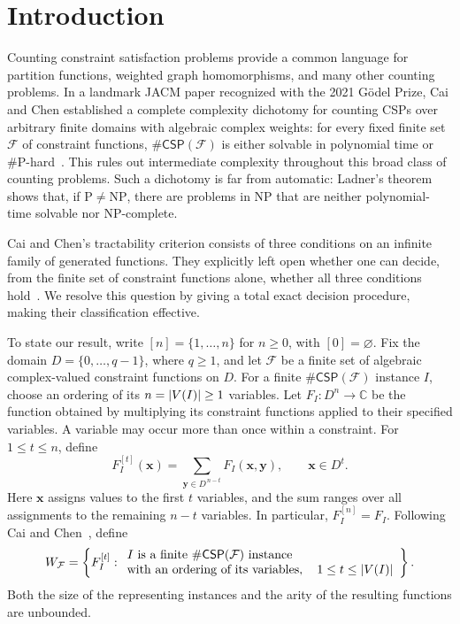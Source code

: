 \documentclass[11pt,letterpaper,onecolumn]{article}
\theoremstyle{plain}
\theoremstyle{definition}
\theoremstyle{remark}
\newcommand{\cF}{\mathcal F}
\newcommand{\CSP}[1]{\mathsf{\#CSP}(#1)}
\DeclarePairedDelimiter{\abs}{\lvert}{\rvert}
\begin{document}
\section{Introduction}
\label{sec:introduction}

Counting constraint satisfaction problems provide a common language for
partition functions, weighted graph homomorphisms, and many other counting
problems.  In a landmark JACM paper recognized with the 2021 G{\"o}del Prize,
Cai and Chen established a complete complexity dichotomy for counting CSPs
over arbitrary finite domains with algebraic complex weights: for every
fixed finite set $\cF$ of constraint functions, $\CSP{\cF}$ is either solvable
in polynomial time or $\#\mathrm P$-hard~\cite{CaiChen2017}.  This rules out
intermediate complexity throughout this broad class of counting problems.
Such a dichotomy is far from automatic: Ladner's theorem~\cite{Ladner1975}
shows that, if $\mathrm P\ne\mathrm{NP}$, there are problems in $\mathrm{NP}$
that are neither polynomial-time solvable nor $\mathrm{NP}$-complete.

Cai and Chen's tractability criterion consists of three conditions on an
infinite family of generated functions.  They explicitly left open whether
one can decide, from the finite set of constraint functions alone, whether
all three conditions hold~\cite[Section~9]{CaiChen2017}.  We resolve this
question by giving a total exact decision procedure, making their
classification effective.

To state our result, write $[n]=\{1,\ldots,n\}$ for $n\ge0$, with
$[0]=\varnothing$.  Fix the domain $D=\{0,\ldots,q-1\}$, where $q\ge1$,
and let $\cF$ be a finite set of algebraic complex-valued constraint functions
on $D$.  For a finite $\CSP{\cF}$ instance $I$, choose an ordering of its
$n=\abs{V(I)}\ge1$ variables.  Let $F_I:D^n\to\mathbb C$ be the function
obtained by multiplying its constraint functions applied to their specified
variables. A variable may occur more than once within a constraint.
For $1\le t\le n$, define
\[
  F_I^{[t]}(\mathbf x)
  =\sum_{\mathbf y\in D^{\,n-t}}F_I(\mathbf x,\mathbf y),
  \qquad \mathbf x\in D^t.
\]
Here $\mathbf x$ assigns values to the first $t$ variables, and the sum ranges
over all assignments to the remaining $n-t$ variables.  In particular,
$F_I^{[n]}=F_I$.  Following Cai and Chen~\cite[Section~3]{CaiChen2017}, define
\begin{equation}
  W_{\cF}
  =\left\{F_I^{[t]}:
    \begin{array}{l}
      I\text{ is a finite }\CSP{\cF}\text{ instance}\\
      \text{with an ordering of its variables},\quad
      1\le t\le \abs{V(I)}
    \end{array}
    \right\}.
  \label{eq:intro-generated-family}
\end{equation}
Both the size of the representing instances and the arity of the resulting
functions are unbounded.
\end{document}
